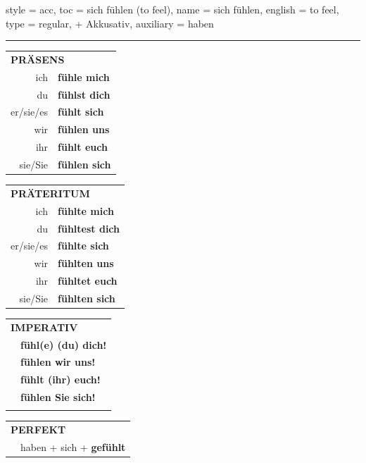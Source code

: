 \begin{verbentry}{
  style = {acc},
  toc = {sich fühlen (to feel)},
  name = {sich fühlen},
  english = {to feel},
  type = {regular, + Akkusativ},
  auxiliary = {haben}
}
 
    
       \vspace{5pt}

    \hrule
    
    \vspace{5pt}

  \begin{tabular}{rl}
     \multicolumn{2}{l}{\textbf{PRÄSENS} }\\
    ich & \textbf{fühle mich}\\
    du & \textbf{fühlst dich}\\
    er/sie/es & \textbf{fühlt sich}\\
    wir & \textbf{fühlen uns}\\
    ihr & \textbf{fühlt euch}\\
    sie/Sie & \textbf{fühlen sich}\\
  \end{tabular}
  \hfill
     \begin{tabular}{rl}
    \multicolumn{2}{l}{\textbf{PRÄTERITUM} }\\
    ich & \textbf{fühlte mich}\\
    du & \textbf{fühltest dich}\\
    er/sie/es & \textbf{fühlte sich}\\
    wir & \textbf{fühlten uns}\\
    ihr & \textbf{fühltet euch}\\
    sie/Sie & \textbf{fühlten sich}\\
  \end{tabular}
  \hfill
  \begin{tabular}{rl}
     \multicolumn{2}{l}{\textbf{IMPERATIV} }\\
   & \textbf{fühl(e) (du) dich!}\\
   & \textbf{fühlen wir uns!}\\
   & \textbf{fühlt (ihr) euch!}\\
   & \textbf{fühlen Sie sich!}\\
   & \vspace{10pt}
  \end{tabular}

    \vspace{10pt}

 \begin{tabular}{rl}
     \multicolumn{2}{l}{\textbf{PERFEKT}}\\
    &haben + sich + \textbf{gefühlt}\\
  \end{tabular}
\hfill
   \begin{tabular}{rl}
   

\end{tabular}
\end{verbentry}
